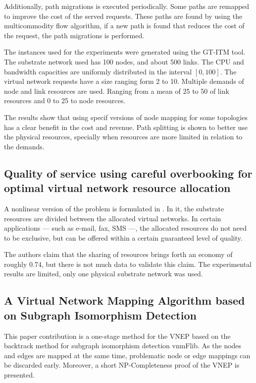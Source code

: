 Additionally, path migrations is executed periodically. Some paths are remapped to improve the cost of the served requests. These paths are found by using the multicommodity flow algorithm, if a new path is found that reduces the cost of the request, the path migrations is performed.

The instances used for the experiments were generated using the GT-ITM tool. The substrate network used has 100 nodes, and about 500 links. The CPU and bandwidth capacities are uniformly distributed in the interval $[0,100]$. The virtual network requests have a size ranging form 2 to 10. Multiple demands of node and link resources are used. Ranging from a mean of 25 to 50 of link resources and 0 to 25 to node resources.

The results show that using specif versions of node mapping for some topologies has a clear benefit in the cost and revenue. Path splitting is shown to better use the physical resources, specially when resources are more limited in relation to the demands.


\subsection{Quality of service using careful overbooking for optimal virtual network resource allocation \cite{Trinh:2011}}
A nonlinear version of the problem is formulated in \cite{Trinh:2011}. In it, the substrate resources are divided between the allocated virtual networks. In certain applications --- such as e-mail, fax, SMS ---, the allocated resources do not need to be exclusive, but can be offered within a certain guaranteed level of quality.

The authors claim that the sharing of resources brings forth an economy of roughly 0.74, but there is not much data to validate this claim. The experimental results are limited, only one physical substrate network was used.

\subsection{A Virtual Network Mapping Algorithm based on Subgraph Isomorphism Detection \cite{Lischka2009}}
This paper contribution is a one-stage method for the VNEP based on the backtrack method for subgraph isomorphism detection vnmFlib. As the nodes and edges are mapped at the same time, problematic node or edge mappings can be discarded early. Moreover, a short NP-Completeness proof of the VNEP is presented.

